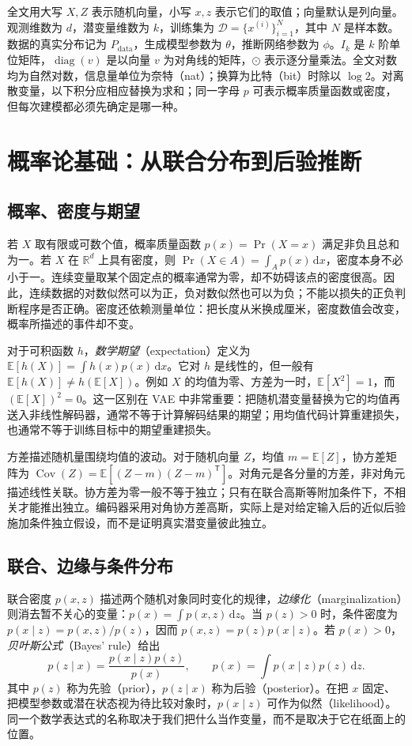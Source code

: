 \documentclass[UTF8,12pt,a4paper,fontset=fandol]{ctexart}
\begin{document}
全文用大写 $X,Z$ 表示随机向量，小写 $x,z$ 表示它们的取值；向量默认是列向量。观测维数为 $d$，潜变量维数为 $k$，训练集为 $\mathcal D=\{x^{(i)}\}_{i=1}^{N}$，其中 $N$ 是样本数。数据的真实分布记为 $P_{\mathrm{data}}$，生成模型参数为 $\theta$，推断网络参数为 $\phi$。$I_k$ 是 $k$ 阶单位矩阵，$\operatorname{diag}(v)$ 是以向量 $v$ 为对角线的矩阵，$\odot$ 表示逐分量乘法。全文对数均为自然对数，信息量单位为奈特（nat）；换算为比特（bit）时除以 $\log 2$。对离散变量，以下积分应相应替换为求和；同一字母 $p$ 可表示概率质量函数或密度，但每次建模都必须先确定是哪一种。

\section{概率论基础：从联合分布到后验推断}
\label{sec:vae-probability}

\subsection{概率、密度与期望}
若 $X$ 取有限或可数个值，概率质量函数 $p(x)=\Pr(X=x)$ 满足非负且总和为一。若 $X$ 在 $\mathbb R^d$ 上具有密度，则 $\Pr(X\in A)=\int_A p(x)\,\mathrm dx$，密度本身不必小于一。连续变量取某个固定点的概率通常为零，却不妨碍该点的密度很高。因此，连续数据的对数似然可以为正，负对数似然也可以为负；不能以损失的正负判断程序是否正确。密度还依赖测量单位：把长度从米换成厘米，密度数值会改变，概率所描述的事件却不变。

对于可积函数 $h$，\emph{数学期望}（expectation）定义为 $\mathbb E[h(X)]=\int h(x)p(x)\,\mathrm dx$。它对 $h$ 是线性的，但一般有 $\mathbb E[h(X)]\ne h(\mathbb E[X])$。例如 $X$ 的均值为零、方差为一时，$\mathbb E[X^2]=1$，而 $(\mathbb E[X])^2=0$。这一区别在 VAE 中非常重要：把随机潜变量替换为它的均值再送入非线性解码器，通常不等于计算解码结果的期望；用均值代码计算重建损失，也通常不等于训练目标中的期望重建损失。

方差描述随机量围绕均值的波动。对于随机向量 $Z$，均值 $m=\mathbb E[Z]$，协方差矩阵为 $\operatorname{Cov}(Z)=\mathbb E[(Z-m)(Z-m)^\mathsf T]$。对角元是各分量的方差，非对角元描述线性关联。协方差为零一般不等于独立；只有在联合高斯等附加条件下，不相关才能推出独立。编码器采用对角协方差高斯，实际上是对给定输入后的近似后验施加条件独立假设，而不是证明真实潜变量彼此独立。

\subsection{联合、边缘与条件分布}
联合密度 $p(x,z)$ 描述两个随机对象同时变化的规律，\emph{边缘化}（marginalization）则消去暂不关心的变量：$p(x)=\int p(x,z)\,\mathrm dz$。当 $p(z)>0$ 时，条件密度为 $p(x\mid z)=p(x,z)/p(z)$，因而 $p(x,z)=p(z)p(x\mid z)$。若 $p(x)>0$，\emph{贝叶斯公式}（Bayes' rule）给出
\begin{equation}
 p(z\mid x)=\frac{p(x\mid z)p(z)}{p(x)},\qquad
 p(x)=\int p(x\mid z)p(z)\,\mathrm dz.
 \label{eq:vae-bayes}
\end{equation}
其中 $p(z)$ 称为先验（prior），$p(z\mid x)$ 称为后验（posterior）。在把 $x$ 固定、把模型参数或潜在状态视为待比较对象时，$p(x\mid z)$ 可作为似然（likelihood）。同一个数学表达式的名称取决于我们把什么当作变量，而不是取决于它在纸面上的位置。
\end{document}
